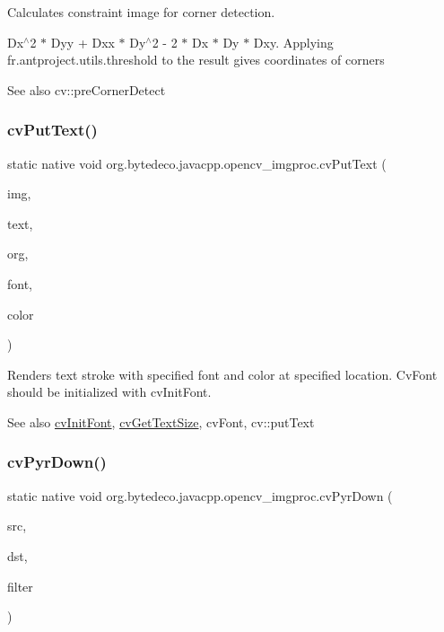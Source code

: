 Calculates constraint image for corner detection. 

Dx$^\wedge$2 $\ast$ Dyy + Dxx $\ast$ Dy$^\wedge$2 -\/ 2 $\ast$ Dx $\ast$ Dy $\ast$ Dxy. Applying fr.antproject.utils.threshold to the result gives coordinates of corners \begin{DoxySeeAlso}{See also}
cv\+::pre\+Corner\+Detect 
\end{DoxySeeAlso}
\mbox{\label{group__imgproc__c_gaa0527c4e076b98ec48324b7585ca98df}} 
\subsubsection{\texorpdfstring{cv\+Put\+Text()}{cvPutText()}}
{\footnotesize\ttfamily static native void org.\+bytedeco.\+javacpp.\+opencv\+\_\+imgproc.\+cv\+Put\+Text (\begin{DoxyParamCaption}\item[{Cv\+Arr}]{img,  }\item[{@Cast(\char`\"{}const char$\ast$\char`\"{}) Byte\+Pointer}]{text,  }\item[{@By\+Val Cv\+fr.antproject.utils.Point}]{org,  }\item[{@Const Cv\+Font}]{font,  }\item[{@By\+Val Cv\+Scalar}]{color }\end{DoxyParamCaption})\hspace{0.3cm}{\ttfamily [static]}}



Renders text stroke with specified font and color at specified location. Cv\+Font should be initialized with cv\+Init\+Font. 

\begin{DoxySeeAlso}{See also}
\hyperlink{group__imgproc__c_ga7802f35f4ff9683ba622d633d5b17a25}{cv\+Init\+Font}, \hyperlink{group__imgproc__c_gaadcbbe95eaad71798726cedfd442c08f}{cv\+Get\+Text\+Size}, cv\+Font, cv\+::put\+Text 
\end{DoxySeeAlso}
\mbox{\label{group__imgproc__c_ga728d5076e2233678be83cad3203472f9}} 
\subsubsection{\texorpdfstring{cv\+Pyr\+Down()}{cvPyrDown()}}
{\footnotesize\ttfamily static native void org.\+bytedeco.\+javacpp.\+opencv\+\_\+imgproc.\+cv\+Pyr\+Down (\begin{DoxyParamCaption}\item[{@Const Cv\+Arr}]{src,  }\item[{Cv\+Arr}]{dst,  }\item[{int}]{filter }\end{DoxyParamCaption})\hspace{0.3cm}{\ttfamily [static]}}




